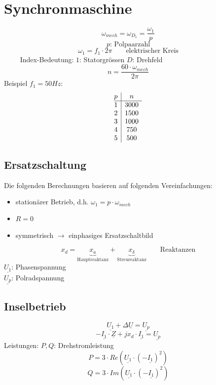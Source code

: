 \section{Synchronmaschine}
\[ \omega_{mech} = \omega_{D_1} = \frac{\omega_1}{p} \]
\[ p\text{: Polpaarzahl} \]
\[ \omega_1 = f_1 \cdot 2 \pi \qquad \text{elektrischer Kreis} \]
$\qquad$ Index-Bedeutung: $1$: Statorgrössen $D$: Drehfeld
\[ n = \frac{60 \cdot \omega_{mech}}{2 \pi} \]
Beispiel $f_1 = 50 Hz$: 
\[ \begin{array}{@{}c|c}
p & n    \\
\hline
1 & 3000 \\
2 & 1500 \\
3 & 1000 \\
4 & 750  \\
5 & 500  \\
\end{array} \]

\subsection{Ersatzschaltung}
Die folgenden Berechnungen basieren auf folgenden Vereinfachungen: 
\begin{itemize}
  \item stationärer Betrieb, d.h. $\omega_1 = p \cdot \omega_{mech}$
  \item $R = 0$
  \item symmetrisch $\rightarrow$ einphasiges Ersatzschaltbild
\end{itemize}
\[ x_d = \underbrace{x_a}_{\text{Hauptreaktanz}} + \underbrace{x_{\delta}}
_{\text{Streureaktanz}}\qquad \text{Reaktanzen} \]
$\underline{U_1}$: Phasenspannung \\
$\underline{U_p}$: Polradspannung

\subsection{Inselbetrieb}
\[ \underline{U_1} + \Delta \underline{U} = \underline{U_p} \]
\[ -\underline{I_1} \cdot \underline{Z} + j x_d \cdot \underline{I_1} 
= \underline{U_p} \]
Leistungen: $P, Q$: Drehstromleistung
\[ P = 3 \cdot Re(\underline{U_1} \cdot (-\underline{I_1})^2) \]
\[ Q = 3 \cdot Im(\underline{U_1} \cdot (-\underline{I_1})^2) \]


